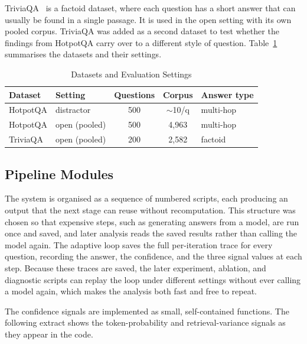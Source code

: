 \documentclass[conference,a4paper,10pt]{IEEEtran}
\begin{document}
TriviaQA~\cite{joshi2017triviaqa} is a factoid dataset, where each question has a short
answer that can usually be found in a single passage. It is used in the open setting with
its own pooled corpus. TriviaQA was added as a second dataset to test whether the findings
from HotpotQA carry over to a different style of question. Table~\ref{tab:data} summarises
the datasets and their settings.

\begin{table}[t]
\centering
\caption{Datasets and Evaluation Settings}
\label{tab:data}
\renewcommand{\arraystretch}{1.2}
\begin{tabular}{llccl}
\toprule
\textbf{Dataset} & \textbf{Setting} & \textbf{Questions} & \textbf{Corpus} & \textbf{Answer type} \\
\midrule
HotpotQA & distractor & 500 & {\small$\sim$10/q} & multi-hop \\
HotpotQA & open (pooled) & 500 & 4{,}963 & multi-hop \\
TriviaQA & open (pooled) & 200 & 2{,}582 & factoid \\
\bottomrule
\end{tabular}
\end{table}

\subsection{Pipeline Modules}
The system is organised as a sequence of numbered scripts, each producing an output that
the next stage can reuse without recomputation. This structure was chosen so that
expensive steps, such as generating answers from a model, are run once and saved, and
later analysis reads the saved results rather than calling the model again. The adaptive
loop saves the full per-iteration trace for every question, recording the answer, the
confidence, and the three signal values at each step. Because these traces are saved, the
later experiment, ablation, and diagnostic scripts can replay the loop under different
settings without ever calling a model again, which makes the analysis both fast and free
to repeat.

The confidence signals are implemented as small, self-contained functions. The following
extract shows the token-probability and retrieval-variance signals as they appear in the
code.
\end{document}
